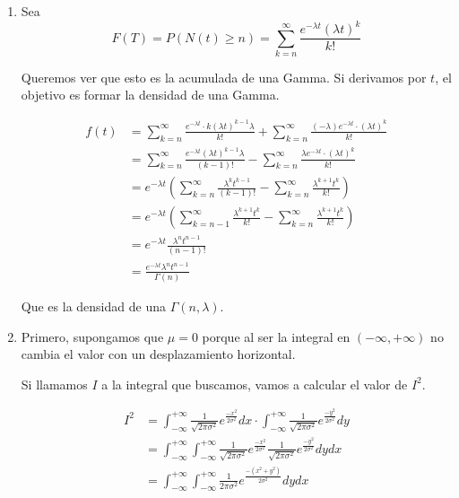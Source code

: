 \begin{enumerate}
	\item
		Sea $$F(T) = P(N(t) \geq n) = \sum_{k=n}^{\infty}\frac{e^{-\lambda t}(\lambda t)^k}{k!}$$
		
		Queremos ver que esto es la acumulada de una Gamma. Si derivamos por $t$, el objetivo es formar la densidad de una Gamma.
		
		\begin{align*}
			f(t)	& = \sum_{k=n}^{\infty}\frac{e^{-\lambda t}\cdot k(\lambda t)^{k-1}\lambda}{k!} + \sum_{k=n}^{\infty}\frac{(-\lambda)e^{-\lambda t}\cdot(\lambda t)^k}{k!}	\\
					& = \sum_{k=n}^{\infty}\frac{e^{-\lambda t}(\lambda t)^{k-1}\lambda}{(k-1)!} - \sum_{k=n}^{\infty}\frac{\lambda e^{-\lambda t}\cdot(\lambda t)^k}{k!}		\\
					& = e^{-\lambda t} \left(\sum_{k=n}^{\infty}\frac{\lambda^k t^{k-1}}{(k-1)!} - \sum_{k=n}^{\infty}\frac{\lambda^{k+1} t^k}{k!}\right)						\\
					& = e^{-\lambda t} \left(\sum_{k=n-1}^{\infty}\frac{\lambda^{k+1} t^k}{k!} - \sum_{k=n}^{\infty}\frac{\lambda^{k+1} t^k}{k!}\right)						\\
					& = e^{-\lambda t} \frac{\lambda^{n} t^{n-1}}{(n-1)!}	\\
					& = \frac{e^{-\lambda t}\lambda^{n} t^{n-1}}{\Gamma(n)}
		\end{align*}
		
		Que es la densidad de una $\Gamma(n, \lambda)$.
	\item
		Primero, supongamos que $\mu=0$ porque al ser la integral en $(-\infty, +\infty)$ no cambia el valor con un desplazamiento horizontal.
		
		Si llamamos $I$ a la integral que buscamos, vamos a calcular el valor de $I^2$.
		
		\begin{align*}
			I^2	& = \int_{-\infty}^{+\infty} \frac{1}{\sqrt{2\pi \sigma^2}}e^{\frac{-x^2}{2\sigma^2}} dx	\cdot \int_{-\infty}^{+\infty} \frac{1}{\sqrt{2\pi \sigma^2}}e^{\frac{-y^2}{2\sigma^2}} dy	\\
				& = \int_{-\infty}^{+\infty} \int_{-\infty}^{+\infty} \frac{1}{\sqrt{2\pi \sigma^2}}e^{\frac{-x^2}{2\sigma^2}} \frac{1}{\sqrt{2\pi \sigma^2}}e^{\frac{-y^2}{2\sigma^2}} dy dx			\\
				& = \int_{-\infty}^{+\infty} \int_{-\infty}^{+\infty} \frac{1}{2\pi \sigma^2} e^{\frac{-(x^2+y^2)}{2\sigma^2}} dy dx
		\end{align*}
		

\end{enumerate}
